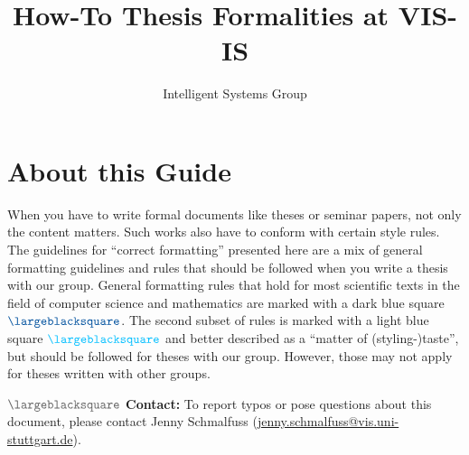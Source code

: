 \documentclass[journal]{vgtc}
\author{Intelligent Systems Group}
\title{How-To Thesis Formalities at VIS-IS}
\newcommand{\lightgreysq}[1]{$\color{CD04}\largeblacksquare$ \textbf{#1:}}
\begin{document}
\setlength{\parindent}{0pt}
\setlength{\parskip}{0.5\baselineskip}



\invisiblelocaltableofcontents \label{toc:overview}

\maketitle
\section*{About this Guide}

When you have to write formal documents like theses or seminar papers, not only the content matters.
Such works also have to conform with certain style rules.
The guidelines for \enquote{correct formatting} presented here are a mix of general formatting guidelines and rules that should be followed when you write a thesis with our group.
General formatting rules that hold for most scientific texts in the field of computer science and mathematics are marked with a dark blue square $\color{CD02}\largeblacksquare$.
The second subset of rules is marked with a light blue square $\color{CD03}\largeblacksquare$ and better described as a \enquote{matter of (styling-)taste}, but should be followed for theses with our group.
However, those may not apply for theses written with other groups.

\lightgreysq{Contact} To report typos or pose questions about this document, please contact Jenny Schmalfuss (\href{mailto:jenny.schmalfuss@vis.uni-stuttgart.de}{jenny.schmalfuss@vis.uni-stuttgart.de}).

\begingroup\parindent 0pt \parfillskip 0pt \leftskip 0cm \rightskip 1cm
    {}
    {\leavevmode\leftskip 0.5cm\relax}
    {\normalsize\makebox[0.5cm][l]{\etocnumber}%
    \etocname\nobreak{\color{gray}\dotfill\phantom{\etocpage}}\nobreak%
    \rlap{\makebox[-0.1cm]{\mdseries\etocpage}}\par\vspace*{-0.4\baselineskip}}
    {}
\tableofcontents
\endgroup
%
%
\end{document}
